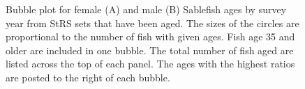 \documentclass[12pt]{article}\usepackage[]{graphicx}\usepackage[]{color}
\begin{document}
\begin{figure}[htb]

{\centering {} 

}

\caption{Bubble plot for female (A) and male (B) Sablefish ages by survey year from StRS sets that have been aged. The sizes of the circles are proportional to the number of fish with given ages. Fish age 35 and older are included in one bubble. The total number of fish aged are listed across the top of each panel. The ages with the highest ratios are posted to the right of each bubble.}\label{fig:figure16}
\end{figure}
\clearpage

~\\
\end{document}
